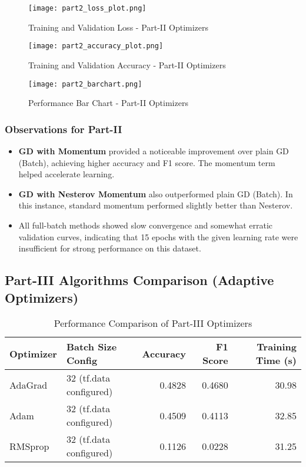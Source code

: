 \documentclass[11pt,a4paper]{article}
\begin{document}
\begin{figure}[H]
    \centering
    \texttt{[image: part2\_loss\_plot.png]} %
    \caption{Training and Validation Loss - Part-II Optimizers}
    \label{fig:part2_loss}
\end{figure}
\begin{figure}[H]
    \centering
    \texttt{[image: part2\_accuracy\_plot.png]} %
    \caption{Training and Validation Accuracy - Part-II Optimizers}
    \label{fig:part2_accuracy}
\end{figure}
\begin{figure}[H]
    \centering
    \texttt{[image: part2\_barchart.png]} %
    \caption{Performance Bar Chart - Part-II Optimizers}
    \label{fig:part2_barchart}
\end{figure}
\clearpage

\subsubsection{Observations for Part-II}
\begin{itemize}
    \item \textbf{GD with Momentum} provided a noticeable improvement over plain GD (Batch), achieving higher accuracy and F1 score. The momentum term helped accelerate learning.
    \item \textbf{GD with Nesterov Momentum} also outperformed plain GD (Batch). In this instance, standard momentum performed slightly better than Nesterov.
    \item All full-batch methods showed slow convergence and somewhat erratic validation curves, indicating that 15 epochs with the given learning rate were insufficient for strong performance on this dataset.
\end{itemize}

\subsection{Part-III Algorithms Comparison (Adaptive Optimizers)}
\begin{table}[H]
    \centering
    \caption{Performance Comparison of Part-III Optimizers}
    \label{tab:part3_summary}
    \begin{tabular}{@{}llrrr@{}}
        \toprule
        Optimizer   & Batch Size Config        & Accuracy & F1 Score & Training Time (s) \\ \midrule
        AdaGrad     & 32 (tf.data configured)  & 0.4828   & 0.4680   & 30.98             \\
        Adam        & 32 (tf.data configured)  & 0.4509   & 0.4113   & 32.85             \\
        RMSprop     & 32 (tf.data configured)  & 0.1126   & 0.0228   & 31.25             \\ \bottomrule
    \end{tabular}
\end{table}
\end{document}
